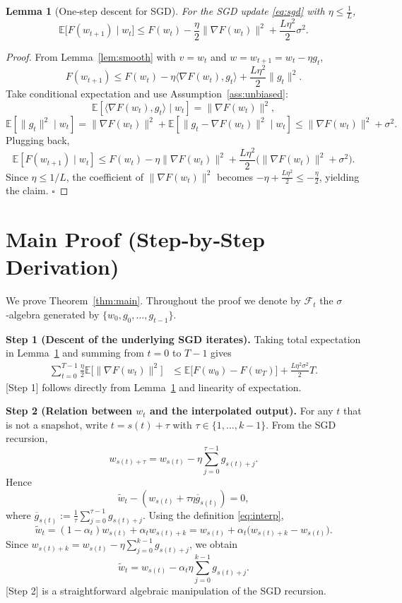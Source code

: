\documentclass{article}
\newtheorem{lemma}{Lemma}
\newcommand{\EE}{\mathbb{E}}
\begin{document}
\begin{lemma}[One‑step descent for SGD]
\label{lem:sgd-descent}
For the SGD update \eqref{eq:sgd} with $\eta\le\frac{1}{L}$,
\[
\EE\big[F(w_{t+1})\mid w_t\big]\le
F(w_t)-\frac{\eta}{2}\|\nabla F(w_t)\|^{2}
+\frac{L\eta^{2}}{2}\sigma^{2}.
\]
\end{lemma}
\begin{proof}
From Lemma~\ref{lem:smooth} with $v=w_t$ and $w=w_{t+1}=w_t-\eta g_t$,
\[
F(w_{t+1})\le F(w_t)-\eta\langle\nabla F(w_t),g_t\rangle
+\frac{L\eta^{2}}{2}\|g_t\|^{2}.
\]
Take conditional expectation and use Assumption~\ref{ass:unbiased}:
\[
\EE[\langle\nabla F(w_t),g_t\rangle\mid w_t]=\|\nabla F(w_t)\|^{2},
\]
\[
\EE[\|g_t\|^{2}\mid w_t]=\|\nabla F(w_t)\|^{2}+\EE[\|g_t-\nabla F(w_t)\|^{2}\mid w_t]
\le\|\nabla F(w_t)\|^{2}+\sigma^{2}.
\]
Plugging back,
\[
\EE[F(w_{t+1})\mid w_t]\le
F(w_t)-\eta\|\nabla F(w_t)\|^{2}
+\frac{L\eta^{2}}{2}\big(\|\nabla F(w_t)\|^{2}+\sigma^{2}\big).
\]
Since $\eta\le1/L$, the coefficient of $\|\nabla F(w_t)\|^{2}$ becomes
$-\eta+\frac{L\eta^{2}}{2}\le-\frac{\eta}{2}$, yielding the claim. $\square$
\end{proof}

\section*{Main Proof (Step‑by‑Step Derivation)}
We prove Theorem~\ref{thm:main}.  Throughout the proof we denote by
$\mathcal{F}_t$ the $\sigma$‑algebra generated by $\{w_0,g_0,\dots,g_{t-1}\}$.

\medskip
\noindent\textbf{Step 1 (Descent of the underlying SGD iterates).}
Taking total expectation in Lemma~\ref{lem:sgd-descent} and summing from $t=0$
to $T-1$ gives
\begin{align}
\sum_{t=0}^{T-1}\frac{\eta}{2}\EE\big[\|\nabla F(w_t)\|^{2}\big]
&\le
\EE\big[F(w_0)-F(w_T)\big]
+\frac{L\eta^{2}\sigma^{2}}{2}T. \tag{2}
\end{align}
[Step 1] follows directly from Lemma~\ref{lem:sgd-descent} and linearity of expectation.

\medskip
\noindent\textbf{Step 2 (Relation between $w_t$ and the interpolated output).}
For any $t$ that is not a snapshot, write $t=s(t)+\tau$ with $\tau\in\{1,\dots,k-1\}$.
From the SGD recursion,
\[
w_{s(t)+\tau}=w_{s(t)}-\eta\sum_{j=0}^{\tau-1}g_{s(t)+j}.
\]
Hence
\[
\widetilde w_t-(w_{s(t)}+\tau\eta\overline g_{s(t)})=0,
\]
where $\overline g_{s(t)}:=\frac{1}{\tau}\sum_{j=0}^{\tau-1}g_{s(t)+j}$.
Using the definition \eqref{eq:interp},
\[
\widetilde w_t
= (1-\alpha_t)w_{s(t)}+\alpha_t w_{s(t)+k}
= w_{s(t)}+\alpha_t\bigl(w_{s(t)+k}-w_{s(t)}\bigr).
\]
Since $w_{s(t)+k}=w_{s(t)}-\eta\sum_{j=0}^{k-1}g_{s(t)+j}$, we obtain
\[
\widetilde w_t
= w_{s(t)}-\alpha_t\eta\sum_{j=0}^{k-1}g_{s(t)+j}. \tag{3}
\]
[Step 2] is a straightforward algebraic manipulation of the SGD recursion.
\end{document}

